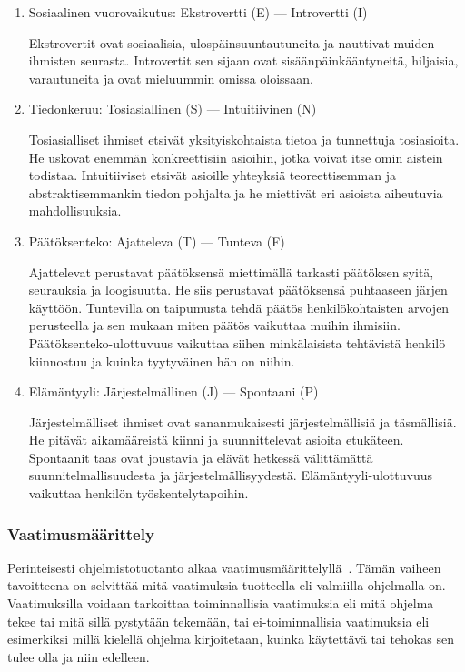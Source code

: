 \documentclass[finnish]{../tktltiki2}
\theoremstyle{definition}
\theoremstyle{remark}
\begin{document}
\begin{enumerate}

\item Sosiaalinen vuorovaikutus: Ekstrovertti (E) --- Introvertti (I)

Ekstrovertit ovat sosiaalisia, ulospäinsuuntautuneita ja nauttivat
muiden ihmisten seurasta. Introvertit sen sijaan ovat sisäänpäinkääntyneitä, hiljaisia, varautuneita ja ovat mieluummin omissa oloissaan.

\item Tiedonkeruu: Tosiasiallinen (S) --- Intuitiivinen (N)

Tosiasialliset ihmiset etsivät yksityiskohtaista tietoa ja tunnettuja
tosiasioita. He uskovat enemmän konkreettisiin asioihin, jotka
voivat itse omin aistein todistaa. Intuitiiviset etsivät asioille
yhteyksiä teoreettisemman ja abstraktisemmankin tiedon pohjalta ja
he miettivät eri asioista aiheutuvia mahdollisuuksia.

\item Päätöksenteko: Ajatteleva (T) --- Tunteva (F)

Ajattelevat perustavat päätöksensä miettimällä tarkasti päätöksen syitä, seurauksia ja loogisuutta. He siis perustavat päätöksensä puhtaaseen järjen käyttöön. Tuntevilla on taipumusta tehdä päätös
henkilökohtaisten arvojen perusteella ja sen mukaan miten päätös
vaikuttaa muihin ihmisiin. Päätöksenteko-ulottuvuus vaikuttaa siihen minkälaisista tehtävistä
henkilö kiinnostuu ja kuinka tyytyväinen hän on niihin.

\item Elämäntyyli: Järjestelmällinen (J) --- Spontaani (P)

Järjestelmälliset ihmiset ovat sananmukaisesti järjestelmällisiä
ja täsmäl\-lisiä. He pitävät aikamääreistä kiinni ja suunnittelevat
asioita etukäteen. Spontaanit taas ovat joustavia ja elävät
hetkessä välittämättä suunnitelmallisuudesta ja järjestelmällisyydestä.
Elämäntyyli-ulottuvuus vaikuttaa henkilön työskentelytapoihin.

\end{enumerate}

\subsubsection{Vaatimusmäärittely}

Perinteisesti ohjelmistotuotanto alkaa vaatimusmäärittelyllä~\cite{Sommerville:2005:IRE:1042197.1042341}. Tämän vaiheen tavoitteena on selvittää mitä vaatimuksia
tuotteella eli valmiilla ohjelmalla on. Vaatimuksilla voidaan tarkoittaa toiminnallisia vaatimuksia eli
mitä ohjelma tekee tai mitä sillä pystytään tekemään, tai ei-toiminnallisia vaatimuksia eli esimerkiksi millä kielellä
ohjelma kirjoitetaan, kuinka käytettävä tai tehokas sen tulee olla ja niin edelleen.\\
\end{document}
